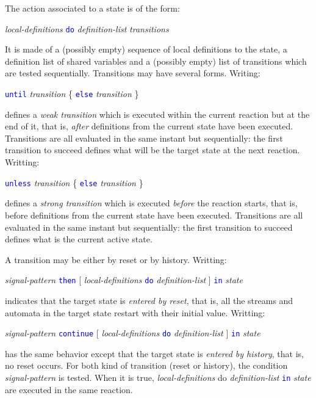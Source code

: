 \documentclass[11pt,titlepage,twoside]{report}
\newcommand{\Then}{\mbox{{\tt then}}}
\newcommand{\Until}{\mbox{\tt until}}
\newcommand{\Unless}{\mbox{\tt unless}}
\newcommand{\Continue}{\mbox{\tt continue}}
\newcommand{\Do}{\mbox{\tt do}}
\newcommand{\term}[1]{\textcolor{Blue}{\tt #1}}
\newcommand{\nterm}[1]{\textcolor{BrickRed}{\it #1}}
\newcommand{\term}[1]{{\tt #1}}
\newcommand{\nterm}[1]{{\em #1}}
\begin{document}
The action associated to a state is of the form:
\begin{center}
  \nterm{local-definitions} \term{\Do} \nterm{definition-list} 
  \nterm{transitions}
\end{center}
It is made of a (possibly empty) sequence of local definitions to the
state, a definition list of shared variables and a (possibly empty)
list of transitions which are tested sequentially. Transitions may
have several forms.  Writing:
\begin{center}
  \term{\Until} \nterm{transition} \{ \term{else} \nterm{transition} \}
  \end{center}
defines a {\em weak transition} which is executed within the current reaction
but at the end of it, that is, {\em after} definitions from the current state have
been executed. Transitions are all evaluated in the same instant but
sequentially: the first transition to succeed defines what will be the target
state at the next reaction. Writting:
\begin{center}
  \term{\Unless} \nterm{transition} \{ \term{else} \nterm{transition} \}
\end{center}
defines a {\em strong transition} which is executed {\em before} the
reaction starts, that is, before definitions from the current state
have been executed. Transitions are all evaluated in the same instant
but sequentially: the first transition to succeed defines what is the
current active state.

A transition may be either by reset or by
history. Writting:
\begin{center}
  \nterm{signal-pattern} \term{\Then}
                  [ \nterm{local-definitions} \term{do} \nterm{definition-list} ]
                  \term{in} \nterm{state}
\end{center}
indicates that the target state is {\em entered by reset}, that is, all
the streams and automata in the target state restart with their initial
value.  Writting: 
\begin{center}
  \nterm{signal-pattern} \term{\Continue}
                  [ \nterm{local-definitions} \term{do} \nterm{definition-list} ]
                  \term{in} \nterm{state}
\end{center}
has the same behavior except that the target state is {\em entered by
  history}, that is, no reset occurs. For both kind of transition
(reset or history), the condition \nterm{signal-pattern} is
tested. When it is true, \nterm{local-definitions} do
\nterm{definition-list} \term{in} \nterm{state} are executed in the same reaction.
\end{document}
